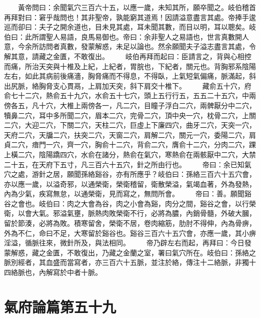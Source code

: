 　　黃帝問曰：余聞氣穴三百六十五，以應一歲，未知其所，願卒聞之。岐伯稽首再拜對曰：窘乎哉問也！其非聖帝，孰能窮其道焉！因請溢意盡言其處。帝捧手逡巡而卻曰：夫子之開余道也，目未見其處，耳未聞其數，而目以明，耳以聰矣。岐伯曰：此所謂聖人易語，良馬易御也。帝曰：余非聖人之易語也，世言真數開人意，今余所訪問者真數，發蒙解惑，未足以論也。然余願聞夫子溢志盡言其處，令解其意，請藏之金匱，不敢復出。
　　岐伯再拜而起曰：臣請言之，背與心相控而痛，所治天突與十椎及上紀，上紀者，胃脘也，下紀者，關元也。背胸邪系陰陽左右，如此其病前後痛濇，胸脅痛而不得息，不得臥，上氣短氣偏痛，脈滿起，斜出尻脈，絡胸脅支心貫鬲，上肩加天突，斜下肩交十椎下。
　　藏俞五十穴，府俞七十二穴，熱俞五十九穴，水俞五十七穴，頭上五行行五，五五二十五穴，中兩傍各五，凡十穴，大椎上兩傍各一，凡二穴，目瞳子浮白二穴，兩髀厭分中二穴，犢鼻二穴，耳中多所聞二穴，眉本二穴，完骨二穴，頂中央一穴，枕骨二穴，上關二穴，大迎二穴，下關二穴，天柱二穴，巨虛上下廉四穴，曲牙二穴，天突一穴，天府二穴，天牖二穴，扶突二穴，天窗二穴，肩解二穴，關元一穴，委陽二穴，肩貞二穴，瘖門一穴，齊一穴，胸俞十二穴，背俞二穴，膺俞十二穴，分肉二穴，踝上橫二穴，陰陽蹻四穴，水俞在諸分，熱俞在氣穴，寒熱俞在兩骸厭中二穴，大禁二十五，在天府下五寸，凡三百六十五穴，針之所由行也。
　　帝曰：余已知氣穴之處，游針之居，願聞孫絡谿谷，亦有所應乎？岐伯曰：孫絡三百六十五穴會，亦以應一歲，以溢奇邪，以通榮衛，榮衛稽留，衛散榮溢，氣竭血著，外為發熱，內為少氣，疾寫無怠，以通榮衛，見而寫之，無問所會。
　　帝曰：善。願聞谿谷之會也。岐伯曰：肉之大會為谷，肉之小會為谿，肉分之間，谿谷之會，以行榮衛，以會大氣。邪溢氣壅，脈熱肉敗榮衛不行，必將為膿，內銷骨髓，外破大膕，留於節湊，必將為敗。積寒留舍，榮衛不居，卷肉縮筋，肋肘不得伸，內為骨痹，外為不仁，命曰不足，大寒留於谿谷也。谿谷三百六十五穴會，亦應一歲，其小痹淫溢，循脈往來，微針所及，與法相同。
　　帝乃辟左右而起，再拜曰：今日發蒙解惑，藏之金匱，不敢復出，乃藏之金蘭之室，署曰氣穴所在。岐伯曰：孫絡之脈別經者，其血盛而當寫者，亦三百六十五脈，並注於絡，傳注十二絡脈，非獨十四絡脈也，內解寫於中者十脈。

\section{氣府論篇第五十九}

